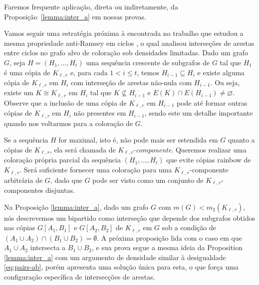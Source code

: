 \documentclass[12pt,a4paper]{book}
\newcommand{\K}{K_{\ell,r}} %
\let\subset\subseteq
\begin{document}
    Faremos frequente aplicação, direta ou indiretamente, da Proposição~\ref{lemma:inter_a} em nossas provas.
     
     Vamos seguir uma estratégia próxima à encontrada no trabalho que estudou  a mesma propriedade anti-Ramsey em ciclos \cite{barros2021anti}, o qual analisou interseções de arestas entre ciclos no grafo alvo de coloração sob densidades limitadas.
     Dado um grafo $G$, seja $H = (H_1, \ldots, H_t)$ uma sequência crescente de subgrafos de $G$ tal que
    $H_1$ é uma cópia de $\K$ e, para cada $1 < i \leq t$, temos $H_{i-1} \subseteq H_i$ e existe alguma cópia de $\K$ em $H_{i}$ com interseção de arestas não-nula com $H_{i-1}$. 
    Ou seja, existe um $K \cong \K$ em $H_{i}$ tal que $K \not\subset H_{i-1}$ e $E(K) \cap E(H_{i-1}) \neq\varnothing$.
     Observe que a inclusão de uma cópia de $\K$ em $H_{i-1}$ pode até formar outras cópias de $\K$ em $H_{i}$ não presentes em $H_{i-1}$, sendo este um detalhe importante quando nos voltarmos para a coloração de $G$.
     
     Se a sequência $H$ for maximal, isto é, não pode mais ser estendida em $G$ quanto a cópias de $\K$, ela será chamada de $\K$-\emph{componente}.
     Queremos realizar uma coloração própria parcial da sequência $(H_1, \ldots, H_t)$ que evite cópias  rainbow de $\K$. 
     Será suficiente fornecer uma coloração para uma $\K$-componente arbitrária de $G$, dado que $G$ pode ser visto como um conjunto de $\K$-componentes disjuntas.
 
 Na Proposição \ref{lemma:inter_a}, dado um grafo $G$ com
 $m(G) < m_2(\K)$, nós descrevemos um bipartido como interseção que depende dos subgrafos obtidos nas cópias $G[A_1,B_1]$ e $G[A_2,B_2]$ de $K_{\ell,r}$ em $G$ sob a condição de $(A_1\cup A_2)\cap(B_1\cup B_2) = \emptyset$. %
 A próxima proposição lida com o caso em que $A_1\cup A_2$ intersecta a $B_1\cup B_2$, e sua prova segue a mesma ideia da Proposition \ref{lemma:inter_a} com um argumento de densidade similar à desigualdade \ref{eq:pairs-ab}, porém apresenta uma solução única para esta, o que força uma configuração específica de intersecções de arestas.
\end{document}
